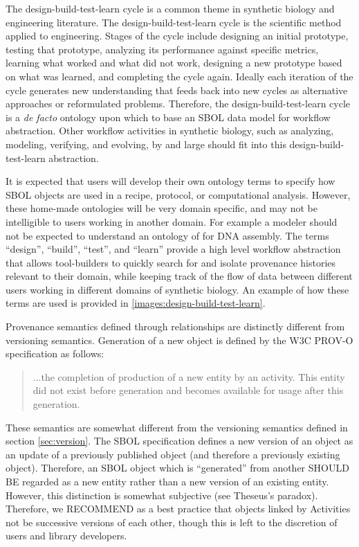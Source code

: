 The design-build-test-learn cycle is a common theme in synthetic biology and engineering literature. The design-build-test-learn cycle is the scientific method applied to engineering. Stages of the cycle include designing an initial prototype, testing that prototype, analyzing its performance against specific metrics, learning what worked and what did not work, designing a new prototype based on what was learned, and completing the cycle again. Ideally each iteration of the cycle generates new understanding that feeds back into new cycles as alternative approaches or reformulated problems. Therefore, the design-build-test-learn cycle is a \textit{de facto} ontology upon which to base an SBOL data model for workflow abstraction. Other workflow activities in synthetic biology, such as analyzing, modeling, verifying, and evolving, by and large should fit into this design-build-test-learn abstraction. 

It is expected that users will develop their own ontology terms to specify how SBOL objects are used in a recipe, protocol, or computational analysis. However, these home-made ontologies will be very domain specific, and may not be intelligible to users working in another domain. For example a modeler should not be expected to understand an ontology of   for DNA assembly. The terms ``design'', ``build'', ``test'', and ``learn'' provide a high level workflow abstraction that allows tool-builders to quickly search for and isolate provenance histories relevant to their domain, while keeping track of the flow of data between different users working in different domains of synthetic biology. An example of how these terms are used is provided in \ref{images:design-build-test-learn}.

Provenance semantics defined through  relationships are distinctly different from versioning semantics. Generation of a new object is defined by the W3C PROV-O specification as follows:
\begin{quote}
...the completion of production of a new entity by an activity. This entity did not exist before generation and becomes available for usage after this generation.
\end{quote}
These semantics are somewhat different from the versioning semantics defined in section \ref{sec:version}. The SBOL specification defines a new version of an object as an update of a previously published object (and therefore a previously existing object). Therefore, an SBOL object which is ``generated'' from another SHOULD BE regarded as a new entity rather than a new version of an existing entity. However, this distinction is somewhat subjective (see Theseus's paradox). Therefore, we RECOMMEND as a best practice that objects linked by Activities not be successive versions of each other, though this is left to the discretion of users and library developers.



